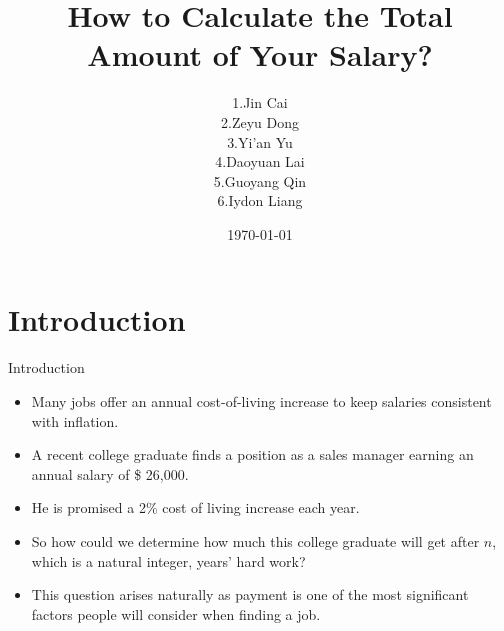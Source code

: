 \title[The Geometric Progression]{How to Calculate the Total Amount of Your Salary?}
\author[MA320 Group]{
    \begin{tabular}{ll}
        1. & Jin Cai \\
        2. & Zeyu Dong \\
        3. & Yi'an Yu \\
        4. & Daoyuan Lai \\
        5. & Guoyang Qin \\
        6. & Iydon Liang
    \end{tabular}
}
\date{\today}

\begin{frame}
    \maketitle
\end{frame}



\section{Introduction}
\begin{frame}[<+->]{Introduction}
    \begin{exmp}
        \begin{itemize}
            \item Many jobs offer an annual cost-of-living increase to keep salaries consistent with inflation.
            \item A recent college graduate finds a position as a sales manager earning an annual salary of \$ 26,000.
            \item He is promised a 2\% cost of living increase each year.
        \end{itemize}
    \end{exmp}
    \begin{itemize}
        \item So how could we determine how much this college graduate will get after $n$, which is a natural integer, years' hard work?
        \item This question arises naturally as payment is one of the most significant factors people will consider when finding a job.
    \end{itemize}
\end{frame}



